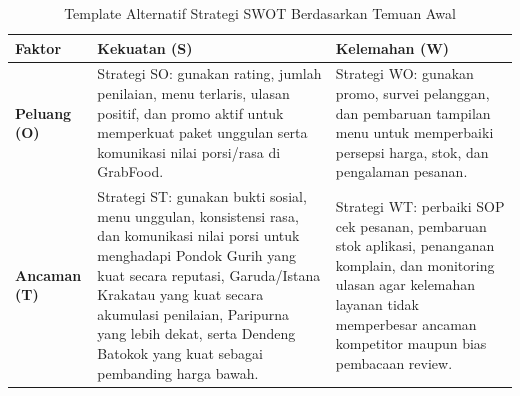 \begin{table}[!htbp]
    \centering
    \caption{Template Alternatif Strategi SWOT Berdasarkan Temuan Awal}
    \label{tab:template-alternatif-strategi-swot}
    \scriptsize
    \setlength{\tabcolsep}{3pt}
    \renewcommand{\arraystretch}{0.92}
    \begin{tabularx}{\textwidth}{|Z{2.4cm}|Y|Y|}
        \toprule
        \textbf{Faktor} & \textbf{Kekuatan (S)} & \textbf{Kelemahan (W)} \\ \hline
        \midrule
        \textbf{Peluang (O)} & Strategi SO: gunakan rating, jumlah penilaian, menu terlaris, ulasan positif, dan promo aktif untuk memperkuat paket unggulan serta komunikasi nilai porsi/rasa di GrabFood. & Strategi WO: gunakan promo, survei pelanggan, dan pembaruan tampilan menu untuk memperbaiki persepsi harga, stok, dan pengalaman pesanan. \\ \hline
        \textbf{Ancaman (T)} & Strategi ST: gunakan bukti sosial, menu unggulan, konsistensi rasa, dan komunikasi nilai porsi untuk menghadapi Pondok Gurih yang kuat secara reputasi, Garuda/Istana Krakatau yang kuat secara akumulasi penilaian, Paripurna yang lebih dekat, serta Dendeng Batokok yang kuat sebagai pembanding harga bawah. & Strategi WT: perbaiki SOP cek pesanan, pembaruan stok aplikasi, penanganan komplain, dan monitoring ulasan agar kelemahan layanan tidak memperbesar ancaman kompetitor maupun bias pembacaan review. \\ \hline
        \bottomrule
    \end{tabularx}
\end{table}
